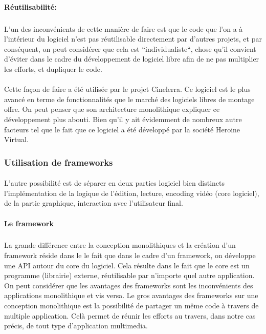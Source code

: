 \paragraph{Réutilisabilité:}

\subparagraph { }

L'un des inconvénients de cette manière de faire est que le code que
l'on a à l'intérieur du logiciel n'est pas réutilisable directement
par d'autres projets, et par conséquent, on peut considérer que cela
est ``individualiste``, chose qu'il convient d'éviter dans le cadre du
développement de logiciel libre afin de ne pas multiplier les efforts,
et dupliquer le code.

\paragraph{}

Cette façon de faire a été utilisée par le projet Cinelerra. Ce
logiciel est le plus avancé en terme de fonctionnalités que le
marché des logiciels libres de montage offre. On peut penser que son
architecture monolithique expliquer ce développement
plus abouti. Bien qu'il y ait évidemment de nombreux autre facteurs
tel que le fait que ce logiciel a été développé par la société
Heroine Virtual.

\subsubsection {Utilisation de  frameworks }

\paragraph{} L'autre possibilité est de séparer en deux parties logiciel
bien distincts l'implémentation de la logique de l'édition, lecture,
encoding vidéo (core logiciel), de la partie graphique, interaction
avec l'utilisateur final.

\paragraph {Le framework}

\subparagraph{}

La grande différence entre la conception monolithiques
 et la création d'un framework 
réside dans le le fait que dans le cadre d'un framework, on développe
une API  autour du core du logiciel. Cela résulte dans le
fait que le core est un programme (librairie) externe, réutilisable par
n'importe quel autre application.  On peut considérer que les avantages
des frameworks sont les inconvénients des applications monolithique
 et vis versa. Le gros avantages des frameworks sur
une conception monolithique est la possibilité de
partager un même code à travers de multiple application. Celà permet de
réunir les efforts au travers, dans notre cas précis, de tout type d'application
multimedia.

